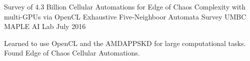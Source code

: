 \begin{cventries}
  \cventry
    {Survey of 4.3 Billion Cellular Automations for Edge of Chaos Complexity with multi-GPUs via OpenCL} %
    {Exhaustive Five-Neighboor Automata Survey} %
    {UMBC MAPLE AI Lab} %
    {July 2016} %
    {
      \begin{cvitems} %
        \item {Learned to use OpenCL and the AMDAPPSKD for large computational tasks. Found Edge of Chaos Cellular Automations.}
      \end{cvitems}
    }


\end{cventries}

